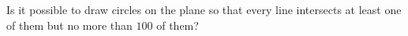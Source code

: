 Is it possible to draw circles on the plane so that every line intersects at least one of them but no more than $100$ of them?